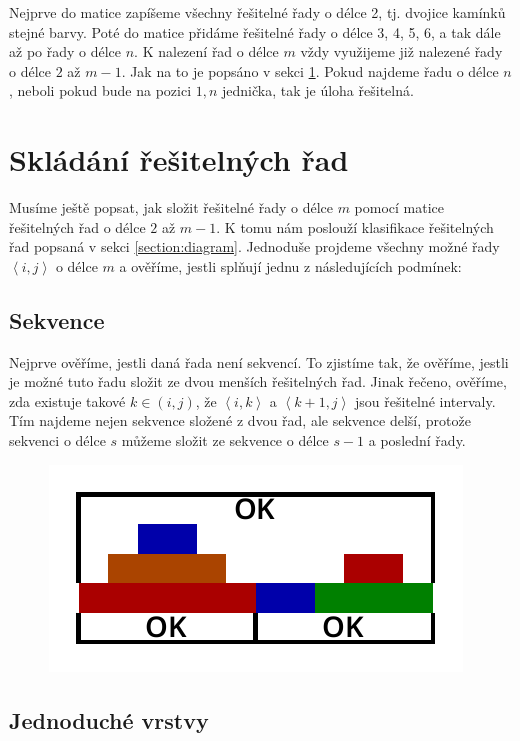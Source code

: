 \documentclass{article}
\begin{document}
Nejprve do matice zapíšeme všechny řešitelné řady o délce 2, tj. dvojice kamínků stejné barvy. Poté do matice přidáme řešitelné řady o délce 3, 4, 5, 6, a tak dále až po řady o délce $n$. K nalezení řad o délce $m$ vždy využijeme již nalezené řady o délce $2$ až $m - 1$. Jak na to je popsáno v sekci \ref{section:composition}. Pokud najdeme řadu o délce $n$, neboli pokud bude na pozici $1, n$ jednička, tak je úloha řešitelná.

\section{Skládání řešitelných řad}
\label{section:composition}

Musíme ještě popsat, jak složit řešitelné řady o délce $m$ pomocí matice řešitelných řad o délce $2$ až $m - 1$. K tomu nám poslouží klasifikace řešitelných řad popsaná v sekci \ref{section:diagram}. Jednoduše projdeme všechny možné řady $\left<i, j\right>$ o délce $m$ a ověříme, jestli splňují jednu z následujících podmínek:

\subsection{Sekvence}

Nejprve ověříme, jestli daná řada není sekvencí. To zjistíme tak, že ověříme, jestli je možné tuto řadu složit ze dvou menších řešitelných řad. Jinak řečeno, ověříme, zda existuje takové $k \in \left(i, j\right)$, že $\left<i, k\right>$ a $\left<k + 1, j\right>$ jsou řešitelné intervaly. Tím najdeme nejen sekvence složené z dvou řad, ale sekvence delší, protože sekvenci o délce $s$ můžeme složit ze sekvence o délce $s - 1$ a poslední řady.

\begin{figure}[H]
    \centering
    \includegraphics[scale=1]{solve-sequence.pdf}
\end{figure}

\subsection{Jednoduché vrstvy}
\end{document}
